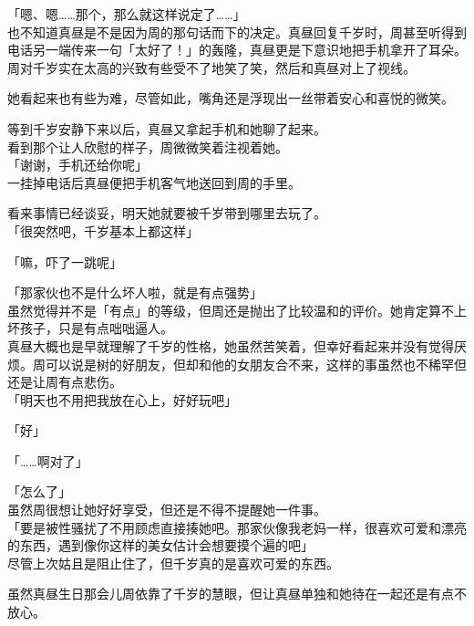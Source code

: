 「嗯、嗯……那个，那么就这样说定了……」\\

也不知道真昼是不是因为周的那句话而下的决定。真昼回复千岁时，周甚至听得到电话另一端传来一句「太好了！」的轰隆，真昼更是下意识地把手机拿开了耳朵。\\

%
周对千岁实在太高的兴致有些受不了地笑了笑，然后和真昼对上了视线。

她看起来也有些为难，尽管如此，嘴角还是浮现出一丝带着安心和喜悦的微笑。

等到千岁安静下来以后，真昼又拿起手机和她聊了起来。\\

看到那个让人欣慰的样子，周微微笑着注视着她。\\

「谢谢，手机还给你呢」\\

一挂掉电话后真昼便把手机客气地送回到周的手里。

看来事情已经谈妥，明天她就要被千岁带到哪里去玩了。\\

「很突然吧，千岁基本上都这样」

「嘛，吓了一跳呢」

「那家伙也不是什么坏人啦，就是有点强势」\\

虽然觉得并不是「有点」的等级，但周还是抛出了比较温和的评价。她肯定算不上坏孩子，只是有点咄咄逼人。\\

%
真昼大概也是早就理解了千岁的性格，她虽然苦笑着，但幸好看起来并没有觉得厌烦。周可以说是树的好朋友，但却和他的女朋友合不来，这样的事虽然也不稀罕但还是让周有点悲伤。\\

「明天也不用把我放在心上，好好玩吧」

「好」

「……啊对了」

「怎么了」\\

虽然周很想让她好好享受，但还是不得不提醒她一件事。\\

「要是被性骚扰了不用顾虑直接揍她吧。那家伙像我老妈一样，很喜欢可爱和漂亮的东西，遇到像你这样的美女估计会想要摸个遍的吧」\\

尽管上次姑且是阻止住了，但千岁真的是喜欢可爱的东西。

虽然真昼生日那会儿周依靠了千岁的慧眼，但让真昼单独和她待在一起还是有点不放心。\\

